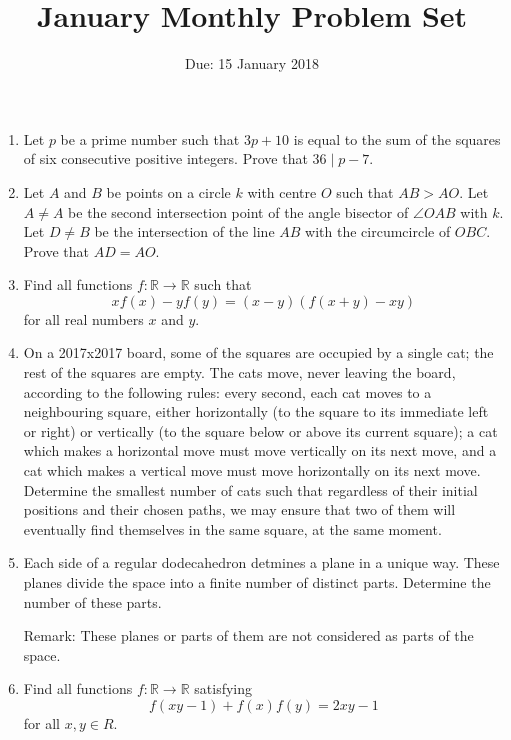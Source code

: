 \documentclass[12pt]{article}
\title{January Monthly Problem Set}
\author{Due: 15 January 2018}
\date{}
\begin{document}
 \maketitle

\begin{enumerate}

\item %
  Let $p$ be a prime number such that $3p+10$ is equal to the sum of the squares of six consecutive positive integers. Prove that $36 \mid p-7$.

 
\item %
Let $A$ and $B$ be points on a circle $k$ with centre $O$ such that $AB > AO$. Let $A \neq A$ be the second intersection point of the angle bisector of $\angle OAB$ with $k$. Let $D \neq B$ be the intersection of the line $AB$ with the circumcircle of $OBC$. Prove that $AD = AO$.


\item %
Find all functions $f : \mathbb{R} \to \mathbb{R}$ such that
  \[ xf(x) - yf(y) = (x - y)(f(x + y) - xy) \]
for all real numbers $x$ and $y$.


\item %
On a 2017x2017 board, some of the squares are occupied by a single cat; the rest of the squares are empty. The cats move, never leaving the board, according to the following rules: every second, each cat moves to a neighbouring square, either horizontally (to the square to its immediate left or right) or vertically (to the square below or above its current square); a cat which makes a horizontal move must move vertically on its next move, and a cat which makes a vertical move must move horizontally on its next move. Determine the smallest number of cats such that regardless of their initial positions and their chosen paths, we may ensure that two of them will eventually find themselves in the same square, at the same moment.


\item %
Each side of a regular dodecahedron detmines a plane in a unique way. These planes divide the space into a finite number of distinct parts. Determine the number of these parts.

\small{Remark: These planes or parts of them are not considered as parts of the space.}


\item %
Find all functions $f: \mathbb{R} \to \mathbb{R}$ satisfying
  \[ f(xy-1) + f(x)f(y) = 2xy-1 \]
for all $x,y\in R$.



\end{enumerate}
\end{document}
